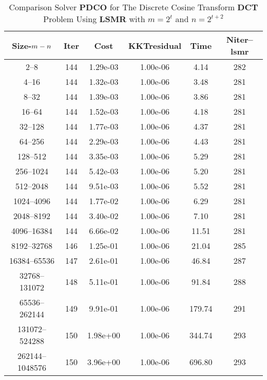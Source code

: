 \begin{table}
\caption{Comparison Solver  {\bf PDCO}  for  The Discrete Cosine Transform {\bf DCT} Problem Using {\bf LSMR} with $m=2^{t}$ and $n=2^{t+2}$} 
\begin{center}
\begin{tabular}{|*{6}{c}|} \hline
Size-$m\--n$& \multicolumn{1}{c}{Iter} & \multicolumn{1}{c}{Cost} & \multicolumn{1}{c}{KKTresidual} & \multicolumn{1}{c}{Time} & \multicolumn{1}{c|}{Niter--lsmr} \\
\hline
2--8            &144  & 1.29e-03& 1.00e-06& 4.14 & 282   \\
4--16           &144  & 1.32e-03& 1.00e-06& 3.48 & 281   \\
8--32           &144  & 1.39e-03& 1.00e-06& 3.86 & 281   \\
16--64          &144  & 1.52e-03& 1.00e-06& 4.18 & 281   \\
32--128         &144  & 1.77e-03& 1.00e-06& 4.37 & 281   \\
64--256         &144  & 2.29e-03& 1.00e-06& 4.43 & 281   \\
128--512        &144  & 3.35e-03& 1.00e-06& 5.29 & 281   \\
256--1024       &144  & 5.42e-03& 1.00e-06& 5.20 & 281   \\
512--2048       &144  & 9.51e-03& 1.00e-06& 5.52 & 281   \\
1024--4096      &144  & 1.77e-02& 1.00e-06& 6.29 & 281   \\
2048--8192      &144  & 3.40e-02& 1.00e-06& 7.10 & 281   \\
4096--16384     &144  & 6.66e-02& 1.00e-06& 11.51& 281   \\
8192--32768     &146  & 1.25e-01& 1.00e-06& 21.04& 285   \\
16384--65536    &147  & 2.61e-01& 1.00e-06& 46.84& 287   \\
32768--131072   &148  & 5.11e-01& 1.00e-06& 91.84& 288   \\
65536--262144   &149  & 9.91e-01& 1.00e-06& 179.74& 291   \\
131072--524288  &150  & 1.98e+00& 1.00e-06& 344.74& 293   \\
262144--1048576 &150  & 3.96e+00& 1.00e-06& 696.80& 293   \\


\end{tabular}
\end{center}
\end{table}
